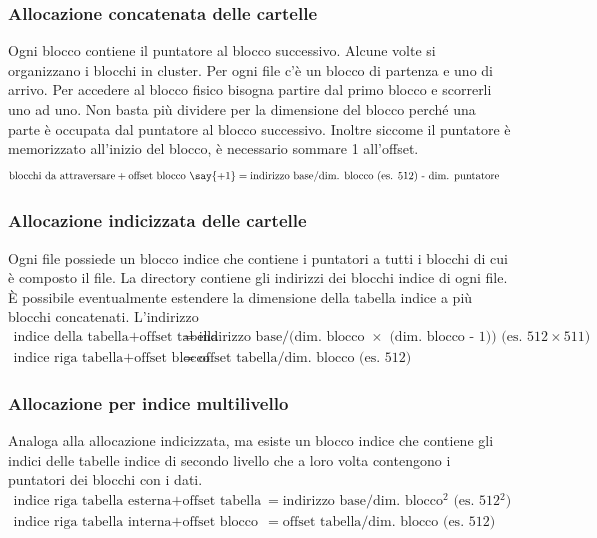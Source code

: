 \documentclass[a4paper]{article}
\begin{document}
\subsubsection*{Allocazione concatenata delle cartelle}
Ogni blocco contiene il puntatore al blocco successivo. Alcune volte si organizzano i blocchi in cluster. Per ogni file c'è un
blocco di partenza e uno di arrivo. Per accedere al blocco fisico bisogna partire dal primo blocco e scorrerli uno ad uno. Non
basta più dividere per la dimensione del blocco perché una parte è occupata dal puntatore al blocco successivo. Inoltre siccome
il puntatore è memorizzato all'inizio del blocco, è necessario sommare 1 all'offset.
\begin{align*}
	\text{blocchi da attraversare} + \text{offset blocco \say{+1}} &= \text{indirizzo base} / \text{dim. blocco (es. 512) - dim. puntatore}
\end{align*}

\subsubsection*{Allocazione indicizzata delle cartelle}
Ogni file possiede un blocco indice che contiene i puntatori a tutti i blocchi di cui è composto il file. La directory contiene
gli indirizzi dei blocchi indice di ogni file. È possibile eventualmente estendere la dimensione della tabella indice a più
blocchi concatenati. L'indirizzo 
\begin{align*}
	\text{indice della tabella} + \text{offset tabella} &= \text{indirizzo base} / \text{(dim. blocco \(\times\) (dim. blocco - 1)) (es. 512\(\times\)511)} \\
	\text{indice riga tabella} + \text{offset blocco} &= \text{offset tabella} / \text{dim. blocco (es. 512)}
\end{align*}

\subsubsection*{Allocazione per indice multilivello}
Analoga alla allocazione indicizzata, ma esiste un blocco indice che contiene gli indici delle tabelle indice di secondo livello
che a loro volta contengono i puntatori dei blocchi con i dati.
\begin{align*}
	\text{indice riga tabella esterna} + \text{offset tabella} &= \text{indirizzo base} / \text{dim. blocco\(^2\) (es. 512\(^2\))} \\
	\text{indice riga tabella interna} + \text{offset blocco} &= \text{offset tabella} / \text{dim. blocco (es. 512)}
\end{align*}
\end{document}
